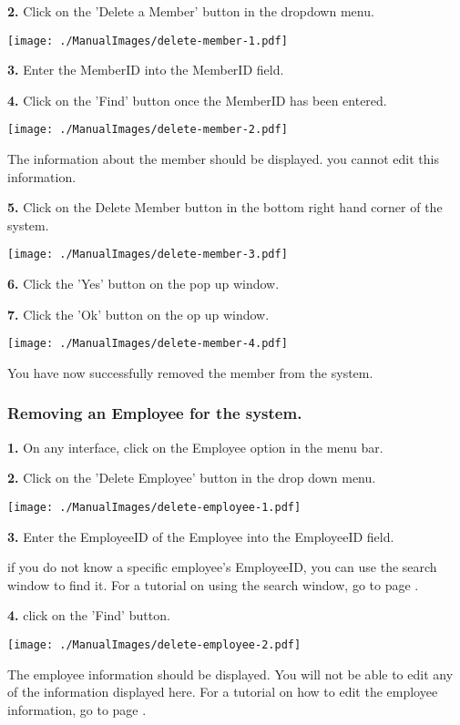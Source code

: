 \textbf{2.} Click on the 'Delete a Member' button in the dropdown menu.

\texttt{[image: ./ManualImages/delete-member-1.pdf]}

\pagebreak

\textbf{3.} Enter the MemberID into the MemberID field.

\textbf{4.} Click on the 'Find' button once the MemberID has been entered.

\texttt{[image: ./ManualImages/delete-member-2.pdf]}

The information about the member should be displayed. you cannot edit this information.

\textbf{5.} Click on the Delete Member button in the bottom right hand corner of the system. 

\texttt{[image: ./ManualImages/delete-member-3.pdf]}

\textbf{6.} Click the 'Yes' button on the pop up window.

\textbf{7.} Click the 'Ok' button on the op up window.

\texttt{[image: ./ManualImages/delete-member-4.pdf]}

You have now successfully removed the member from the system.

\pagebreak
\subsubsection{Removing an Employee for the system.}
\label{fig:Removing an Employee for the system.}

\textbf{1.} On any interface, click on the Employee option in the menu bar.

\textbf{2.} Click on the 'Delete Employee' button in the drop down menu.

\texttt{[image: ./ManualImages/delete-employee-1.pdf]}

\textbf{3.} Enter the EmployeeID of the Employee into the EmployeeID field.

if you do not know a specific employee's EmployeeID, you can use the search window to find it. For a tutorial on using the search window, go to page \pageref{fig:Using the search window}.

\textbf{4.} click on the 'Find' button.

\texttt{[image: ./ManualImages/delete-employee-2.pdf]}

The employee information should be displayed. You will not be able to edit any of the information displayed here. For a tutorial on how to edit the employee information, go to page \pageref{fig:Editing an Employee in the system}.

